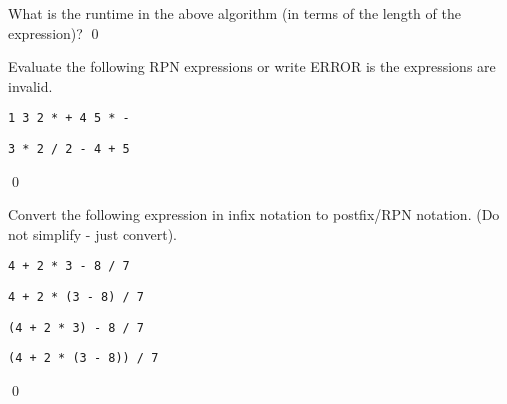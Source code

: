 \begin{ex}
What is the runtime in the above algorithm
(in terms of the length of the expression)?
\qed
\end{ex}


\begin{ex}
  Evaluate the following RPN expressions
  or write ERROR is the expressions are invalid.
\begin{tightlist}
\item \verb!1 3 2 * + 4 5 * -!
\item \verb!3 * 2 / 2 - 4 + 5!
\end{tightlist}
\qed
\end{ex}


\begin{ex}
  Convert the following expression in infix notation to
  postfix/RPN notation. (Do not simplify - just convert).
  \begin{tightlist}
    \item \texttt{4 + 2 * 3 - 8 / 7}
    \item \texttt{4 + 2 * (3 - 8) / 7}
    \item \texttt{(4 + 2 * 3) - 8 / 7}
    \item \texttt{(4 + 2 * (3 - 8)) / 7}    
  \end{tightlist}
  \qed
\end{ex}



